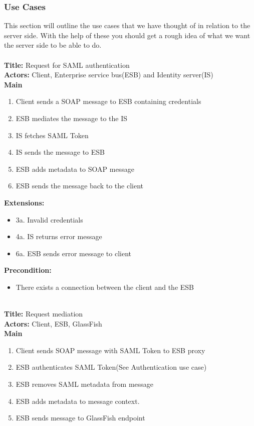     \subsubsection{Use Cases}\label{Server Use Cases}
    This section will outline the use cases that we have thought of in relation to the server side. With the help of these you should get a rough idea of what we want the server side to be able to do.\\\\
    \textbf{Title:} Request for SAML authentication \\
    \textbf{Actors:} Client, Enterprise service bus(ESB) and Identity server(IS)\\
    \textbf{Main}
    \begin{enumerate}
        \item Client sends a SOAP message to ESB containing credentials
        \item ESB mediates the message to the IS
        \item IS fetches SAML Token
        \item IS sends the message to ESB
        \item ESB adds metadata to SOAP message
        \item ESB sends the message back to the client
    \end{enumerate}
    \textbf{Extensions:}
    \begin{itemize}
        \item[] 3a. Invalid credentials 
        \item[] 4a. IS returns error message
        \item[] 6a. ESB sends error message to client
    \end{itemize}
    \textbf{Precondition:}
    \begin{itemize}
        \item There exists a connection between the client and the ESB
    \end{itemize}
    \\
    \textbf{Title:} Request mediation\\
    \textbf{Actors:} Client, ESB, GlassFish\\
    \textbf{Main}
    \begin{enumerate}
        \item Client sends SOAP message with SAML Token to ESB proxy
        \item ESB authenticates SAML Token(See Authentication use case)
        \item ESB removes SAML metadata from message
        \item ESB adds metadata to message context.
        \item ESB sends message to GlassFish endpoint
    \end{enumerate}
